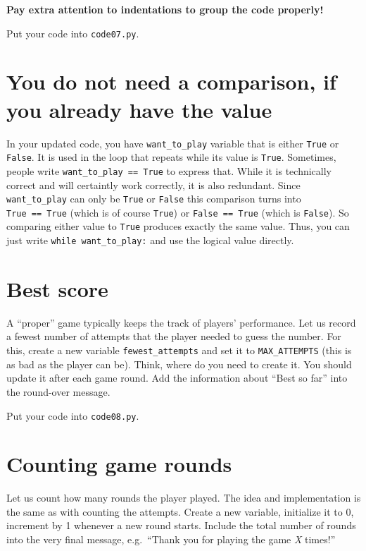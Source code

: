 \documentclass[
]{book}
\begin{document}
\textbf{Pay extra attention to indentations to group the code properly!}

Put your code into \texttt{code07.py}.

\hypertarget{you-do-not-need-a-comparison-if-you-already-have-the-value}{%
\section{You do not need a comparison, if you already have the value}\label{you-do-not-need-a-comparison-if-you-already-have-the-value}}

In your updated code, you have \texttt{want\_to\_play} variable that is either \texttt{True} or \texttt{False}. It is used in the loop that repeats while its value is \texttt{True}. Sometimes, people write \texttt{want\_to\_play\ ==\ True} to express that. While it is technically correct and will certaintly work correctly, it is also redundant. Since \texttt{want\_to\_play} can only be \texttt{True} or \texttt{False} this comparison turns into \texttt{True\ ==\ True} (which is of course \texttt{True}) or \texttt{False\ ==\ True} (which is \texttt{False}). So comparing either value to \texttt{True} produces exactly the same value. Thus, you can just write \texttt{while\ want\_to\_play:} and use the logical value directly.

\hypertarget{best-score}{%
\section{Best score}\label{best-score}}

A ``proper'' game typically keeps the track of players' performance. Let us record a fewest number of attempts that the player needed to guess the number. For this, create a new variable \texttt{fewest\_attempts} and set it to \texttt{MAX\_ATTEMPTS} (this is as bad as the player can be). Think, where do you need to create it. You should update it after each game round. Add the information about ``Best so far'' into the round-over message.

Put your code into \texttt{code08.py}.

\hypertarget{counting-game-rounds}{%
\section{Counting game rounds}\label{counting-game-rounds}}

Let us count how many rounds the player played. The idea and implementation is the same as with counting the attempts. Create a new variable, initialize it to 0, increment by 1 whenever a new round starts. Include the total number of rounds into the very final message, e.g.~``Thank you for playing the game \emph{X} times!''
\end{document}

